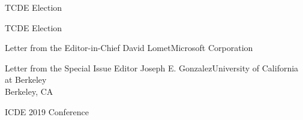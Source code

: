 \documentclass[11pt]{article}
\begin{document}
\begin{bulletin}
\begin{newssection}{TCDE Election}
\end{newssection}

\begin{newssection}{TCDE Election}


\begin{news}{Letter from the Editor-in-Chief}
{David Lomet}{Microsoft Corporation}

\end{news}
%
\newpage
%
%
\begin{news}{Letter from the Special Issue Editor}
{Joseph E. Gonzalez}{University of California at Berkeley\\ Berkeley, CA}

\end{news}

\end{newssection}



\begin{callsection}
%
%
\begin{call}{ICDE 2019 Conference}
\end{call}
\end{callsection}

\end{bulletin}
\end{document}
